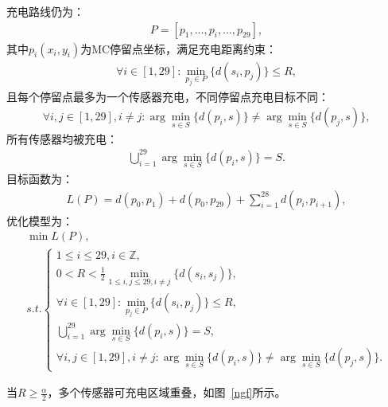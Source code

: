 \documentclass{whutmod}
\begin{document}
                充电路线仍为：
                \begin{gather}
                    P = [p_1, \dots, p_i, \dots, p_{29}],
                \end{gather}
                其中$p_i(x_i, y_i)$为MC停留点坐标，满足充电距离约束：
                \begin{gather}
                    \forall i \in [1, 29]: \min_{p_j \in P} \{ d(s_i, p_j) \} \leqslant R,
                \end{gather}
                且每个停留点最多为一个传感器充电，不同停留点充电目标不同：
                \begin{gather}
                    \forall i, j \in [1, 29], i \neq j: \arg\min_{s \in S} \{ d(p_i, s) \} \neq \arg\min_{s \in S} \{ d(p_j, s) \},
                \end{gather}
                所有传感器均被充电：
                \begin{gather}
                    \bigcup_{i=1}^{29} \arg\min_{s \in S} \{ d(p_i, s) \} = S.
                \end{gather}
                目标函数为：
                \begin{gather*}
                    L(P) = d(p_0, p_1) + d(p_0, p_{29}) + \sum_{i=1}^{28} d(p_i, p_{i+1}),
                \end{gather*}
                优化模型为：
                \begin{gather}
                    \min L(P), \\
                    s.t. \left\{
                    \begin{matrix}
                        1 \leqslant i \leqslant 29, i \in \mathbb{Z}, \\
                        0 < R < \frac{1}{2} \min_{1 \leqslant i, j \leqslant 29, i \neq j} \{ d(s_i, s_j) \}, \\
                        \forall i \in [1, 29]: \min_{p_j \in P} \{ d(s_i, p_j) \} \leqslant R, \\
                        \bigcup_{i=1}^{29} \arg\min_{s \in S} \{ d(p_i, s) \} = S, \\
                        \forall i, j \in [1, 29], i \neq j: \arg\min_{s \in S} \{ d(p_i, s) \} \neq \arg\min_{s \in S} \{ d(p_j, s) \}.
                    \end{matrix}
                    \right.
                \end{gather}

                当$R \geqslant \frac{\alpha}{2}$，多个传感器可充电区域重叠，如图~\ref{ngf}所示。
\end{document}
